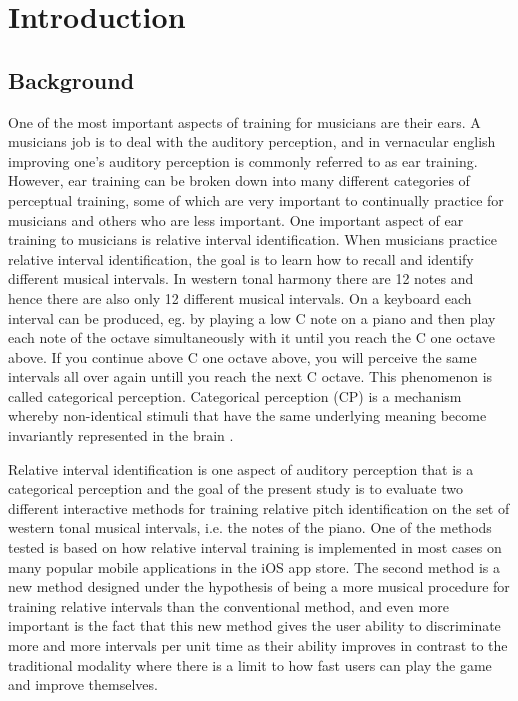 \chapter{Introduction}

\section{Background}
One of the most important aspects of training for musicians are their ears. A musicians job is to deal with the auditory perception, and in vernacular english improving one's auditory perception is commonly referred to as ear training. However, ear training can be broken down into many different categories of perceptual training, some of which are very important to continually practice for musicians and others who are less important.
One important aspect of ear training to musicians is relative interval identification. When musicians practice relative interval identification, the goal is to learn how to recall and identify different musical intervals. In western tonal harmony there are 12 notes and hence there are also only 12 different musical intervals. On a keyboard each interval can be produced, eg. by playing a low C note on a piano and then play each note of the octave simultaneously with it until you reach the C one octave above. If you continue above C one octave above, you will perceive the same intervals all over again untill you reach the next C octave. This phenomenon is called categorical perception. Categorical perception (CP) is a mechanism whereby non-identical stimuli that have the same underlying meaning become invariantly represented in the brain \cite{klein2011role}.

Relative interval identification is one aspect of auditory perception that is a categorical perception and the goal of the present study is to evaluate two different interactive methods for training relative pitch identification on the set of western tonal musical intervals, i.e. the notes of the piano.
One of the methods tested is based on how relative interval training is implemented in most cases on many popular mobile applications in the iOS app store. The second method is a new method designed under the hypothesis of being a more musical procedure for training relative intervals than the conventional method, and even more important is the fact that this new method gives the user ability to discriminate more and more intervals per unit time as their ability improves in contrast to the traditional modality where there is a limit to how fast users can play the game and improve themselves.


